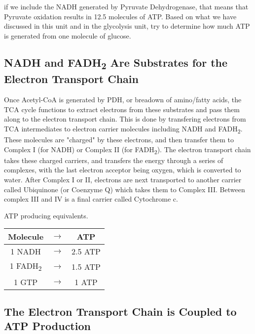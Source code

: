 \documentclass{tufte-handout}
\begin{document}
if we include the NADH generated by Pyruvate Dehydrogenase, that means that Pyruvate oxidation results in 12.5 molecules of ATP.  Based on what we have discussed in this unit and in the glycolysis unit, try to determine how much ATP is generated from one molecule of glucose.

\subsection{NADH and FADH\textsubscript{2} Are Substrates for the Electron Transport Chain}
Once Acetyl-CoA is generated by PDH, or breadown of amino/fatty acids, the TCA cycle functions to extract electrons from these substrates and pass them along to the electron transport chain.  This is done by transfering electrons from TCA intermediates to electron carrier molecules including NADH and FADH\textsubscript{2}.  These molecules are "charged" by these electrons, and then transfer them to Complex I (for NADH) or Complex II (for FADH\textsubscript{2}).  The electron transport chain takes these charged carriers, and transfers the energy through a series of complexes, with the last electron acceptor being oxygen, which is converted to water.  After Complex I or II, electrons are next transported to another carrier called Ubiquinone (or Coenzyme Q) which takes them to Complex III.  Between complex III and IV is a final carrier called Cytochrome c.  

\begin{margintable}
\centering
\caption{ATP producing equivalents.}
\label{tab:atp-equivalents}
\begin{tabular}{ccc}
\hline
\textbf {Molecule} & $\rightarrow$ & \textbf{ATP}\\
\hline
1 NADH & $\rightarrow$ & 2.5 ATP \\
1 FADH\textsubscript{2} & $\rightarrow$ &  1.5 ATP  \\
1 GTP & $\rightarrow$ &  1 ATP  \\
\hline
\end{tabular}
\end{margintable}

\subsection{The Electron Transport Chain is Coupled to ATP Production}
\end{document}
